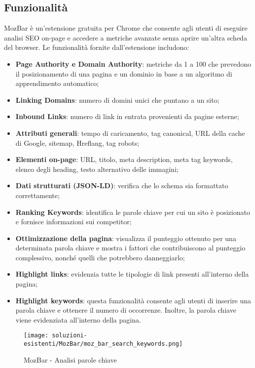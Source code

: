 \subsection{Funzionalità}
\par MozBar è un'estensione gratuita per Chrome che consente agli utenti di eseguire analisi SEO on-page e accedere a metriche avanzate senza aprire un'altra scheda del browser. Le funzionalità fornite dall'estensione includono:
\begin{itemize}
    \item \textbf{Page Authority e Domain Authority}: metriche da 1 a 100 che prevedono il posizionamento di una pagina e un dominio in base a un algoritmo di apprendimento automatico;
    \item \textbf{Linking Domains}: numero di domini unici che puntano a un sito;
    \item \textbf{Inbound Links}: numero di link in entrata provenienti da pagine esterne;
    \item \textbf{Attributi generali}: tempo di caricamento, tag canonical, URL della cache di Google, sitemap, Hreflang, tag robots;
    \item \textbf{Elementi on-page}: URL, titolo, meta description, meta tag keywords, elenco degli heading, testo alternativo delle immagini;
    \item \textbf{Dati strutturati (JSON-LD)}: verifica che lo schema sia formattato correttamente;
    \item \textbf{Ranking Keywords}: identifica le parole chiave per cui un sito è posizionato e fornisce informazioni sui competitor;
    \item \textbf{Ottimizzazione della pagina}: visualizza il punteggio ottenuto per una determinata parola chiave e mostra  i fattori che contribuiscono al punteggio complessivo, nonché quelli che potrebbero danneggiarlo;
    \item \textbf{Highlight links}: evidenzia tutte le tipologie di link presenti all’interno della pagina;
    \item \textbf{Highlight keywords}: questa funzionalità consente agli utenti di inserire una parola chiave e ottenere il numero di occorrenze. Inoltre, la parola chiave viene evidenziata all’interno della pagina.
\end{itemize}

\begin{figure}[H]
    \centering 
    \texttt{[image: soluzioni-esistenti/MozBar/moz\_bar\_search\_keywords.png]} 
    \caption{MozBar - Analisi parole chiave}
\end{figure}

